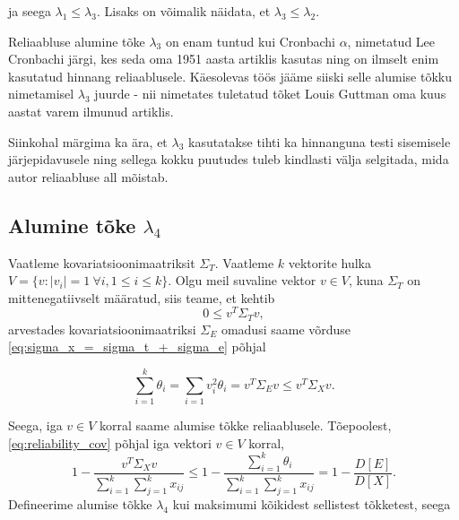 \documentclass[a4paper,12pt,oneside]{article}
\numberwithin{equation}{section}
\theoremstyle{definition}
\begin{document}
ja seega $\lambda_1 \leq \lambda_3$. Lisaks on võimalik näidata, et $\lambda_3 \leq \lambda_2$.


Reliaabluse alumine tõke $\lambda_3$ on enam tuntud kui Cronbachi $\alpha$, nimetatud Lee Cronbachi järgi, kes seda oma 1951 aasta artiklis\cite{Cronbach1951} kasutas ning on ilmselt enim kasutatud hinnang reliaablusele. Käesolevas töös jääme siiski selle alumise tõkku nimetamisel $\lambda_3$ juurde - nii nimetates tuletatud tõket Louis Guttman oma kuus aastat varem ilmunud artiklis\cite{Guttman1945}.

Siinkohal märgima ka ära, et $\lambda_3$ kasutatakse tihti ka hinnanguna testi sisemisele järjepidavusele ning sellega kokku puutudes tuleb kindlasti välja selgitada, mida autor reliaabluse all mõistab.


 

 
\subsection{Alumine tõke $\lambda_4$}

Vaatleme kovariatsioonimaatriksit $\Sigma_T$. Vaatleme $k$ vektorite hulka $V = \lbrace v : \lvert {v_i} \rvert = 1 ~ \forall i, 1 \leq i \leq k \rbrace$.  Olgu meil suvaline vektor $v \in V$, kuna $\Sigma_T$ on mittenegatiivselt määratud, siis teame, et kehtib
\begin{equation*}
0 \leq v^{T} \Sigma_T v,
\end{equation*}
 arvestades kovariatsioonimaatriksi $\Sigma_E$ omadusi saame võrduse \eqref{eq:sigma_x_=_sigma_t_+_sigma_e} põhjal 

\begin{equation*}
\sum \limits_{i=1}^k \theta_i = \sum \limits_{i=1} v_{i}^{2} \theta_i = v^{T} \Sigma_E v \leq v^{T} \Sigma_X v \text{.}
\end{equation*}

Seega, iga $v \in V$ korral saame alumise tõkke reliaablusele. Tõepoolest, \eqref{eq:reliability_cov} põhjal iga vektori $v \in V$ korral,  
\begin{equation*}
1 - \frac{v^T \Sigma_X v}{\sum \limits_{i=1}^k \sum \limits_{j=1}^k x_{ij}} \leq 1 - \frac{\sum \limits_{i=1}^k \theta_i}{\sum \limits_{i=1}^k \sum \limits_{j=1}^k x_{ij}} = 1 - \frac{D \left[ E \right]}{ D \left[X \right]  } \text{.}
\end{equation*} 
Defineerime alumise tõkke $\lambda_4$ kui maksimumi kõikidest sellistest tõkketest, seega
\end{document}
